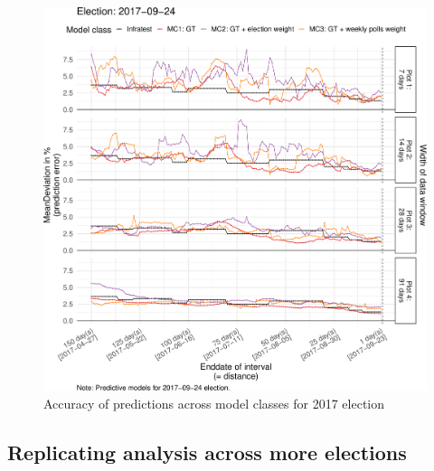 \documentclass[
  letterpaper,
  DIV=11,
  numbers=noendperiod]{scrartcl}
\begin{document}
\begin{figure}[H]

\caption{\label{fig-A8}Accuracy of predictions across model classes for
2017 election}

{\centering \includegraphics{figures/fig-A8-1.pdf}

}

\end{figure}

\hypertarget{replicating-analysis-across-more-elections}{%
\subsection{Replicating analysis across more
elections}\label{replicating-analysis-across-more-elections}}
\end{document}
